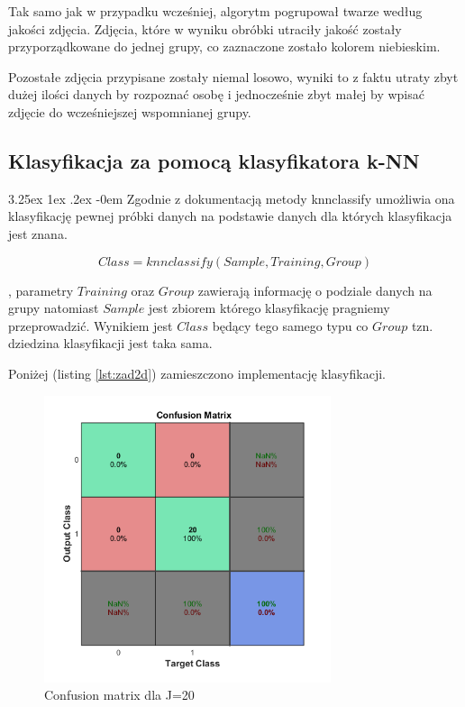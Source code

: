\documentclass[11pt, a4paper]{article}
\makeatletter
\newcommand{\fbi}{\leavevmode{\parindent=1em\indent}}
\renewcommand\paragraph{\@startsection{paragraph}{5}{\z@}
  {3.25ex \@plus1ex \@minus.2ex}
  {-0em}
  {\normalfont\normalsize\bfseries}}
\makeatother
\begin{document}
\fbi
Tak samo jak w przypadku wcześniej, algorytm pogrupował twarze według jakości zdjęcia. Zdjęcia, które w wyniku obróbki utraciły jakość zostały przyporządkowane do jednej grupy, co zaznaczone zostało kolorem niebieskim.

\fbi
Pozostałe zdjęcia przypisane zostały niemal losowo, wyniki to z faktu utraty zbyt dużej ilości danych by rozpoznać osobę i jednocześnie zbyt małej by wpisać zdjęcie do wcześniejszej wspomnianej grupy.

\subsection{Klasyfikacja za pomocą klasyfikatora k-NN}
\paragraph{}
Zgodnie z dokumentacją metody knnclassify \cite{test3} umożliwia ona klasyfikację pewnej próbki danych na podstawie danych dla których klasyfikacja jest znana.

\begin{equation}\label{eq:knnclasify}
Class = knnclassify(Sample, Training, Group)
\end{equation}

, parametry $Training$ oraz $Group$ zawierają informację o podziale danych na grupy natomiast $Sample$ jest zbiorem którego klasyfikację pragniemy przeprowadzić. Wynikiem jest $Class$ będący tego samego typu co $Group$ tzn. dziedzina klasyfikacji jest taka sama.

Poniżej (listing \ref{lst:zad2d}) zamieszczono implementację klasyfikacji.




\begin{figure}[H]
	\centering
	\includegraphics[width=0.75\textwidth]{./assets/ilustracja_zad2_conf_j20.png}
	\caption{Confusion matrix dla J=20}
	\label{fig:ilustracja_zad2_conf_j20}
\end{figure}
\end{document}
